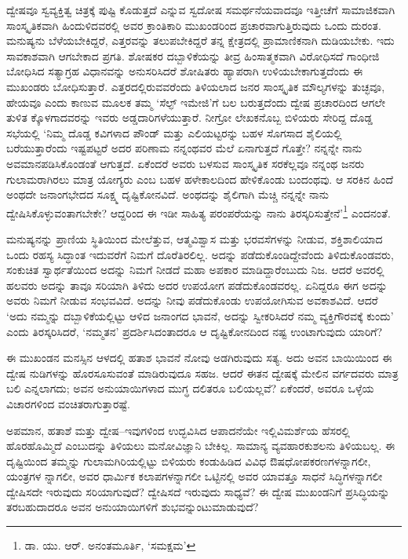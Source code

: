 ದ್ವೇಷವೂ ಸ್ವವ್ಯಕ್ತಿತ್ವ ಚಿತ್ರಕ್ಕೆ ಪುಷ್ಟಿ ಕೊಡುತ್ತದೆ ಎನ್ನುವ ಸ್ವದೋಷ ಸಮರ್ಥನೆಯವಾದವೂ ಇತ್ತೀಚೆಗೆ ಸಾಮಾಜಿಕವಾಗಿ ಸಾಂಸ್ಕೃತಿಕವಾಗಿ ಹಿಂದುಳಿದವರಲ್ಲಿ ಅವರ ಕ್ರಾಂತಿಕಾರಿ ಮುಖಂಡರಿಂದ ಪ್ರಚಾರವಾಗುತ್ತಿರುವುದು ಒಂದು ದುರಂತ. ಮನುಷ್ಯನು ಬೆಳೆಯಬೇಕಿದ್ದರೆ, ಎತ್ತರವನ್ನು ತಲುಪಬೇಕಿದ್ದರೆ ತನ್ನ ಕ್ಷೇತ್ರದಲ್ಲಿ ಪ್ರಾಮಾಣಿಕನಾಗಿ ದುಡಿಯಬೇಕು. ಇದು ಸಾವಕಾಶವಾಗಿ ಆಗಬೇಕಾದ ಪ್ರಗತಿ. ಶೋಷಕರ ದಬ್ಬಾಳಿಕೆಯನ್ನು ತೀವ್ರ ಹಿಂಸಾತ್ಮಕವಾಗಿ ವಿರೋಧಿಸದೆ ಗಾಂಧೀಜಿ ಬೋಧಿಸಿದ ಸತ್ಯಾಗ್ರಹ ವಿಧಾನವನ್ನು ಅನುಸರಿಸಿದರೆ ಶೋಷಿತರು ಹ್ಯಾಪರಾಗಿ ಉಳಿಯಬೇಕಾಗುತ್ತದೆಂದು ಈ ಮುಖಂಡರು ಬೋಧಿಸುತ್ತಾರೆ. ಎತ್ತರದಲ್ಲಿರುವವರೆಂದು ತಿಳಿಯ\-ಲಾದ ಜನರ ಸಾಂಸ್ಕೃತಿಕ ಮೌಲ್ಯಗಳನ್ನು ತುಚ್ಛವೂ, ಹೇಯವೂ ಎಂದು ಕಾಣುವ ಮೂಲಕ ತಮ್ಮ ‘ಸೆಲ್ಫ್ ಇಮೇಜಿ’ಗೆ ಬಲ ಬರುತ್ತದೆಂದು ದ್ವೇಷ ಪ್ರಚಾರದಿಂದ ಆಗಲೇ ತುಳಿತ ಕ್ಕೊಳಗಾದವರನ್ನು ಇವರು ಅಡ್ಡದಾರಿಗಳೆಯುತ್ತಾರೆ. ನೀಗ್ರೋ ಲೇಖಕನೊಬ್ಬ ಬಿಳಿಯರು ಸೇರಿದ್ದ ದೊಡ್ಡ ಸಭೆಯಲ್ಲಿ ‘ನಿಮ್ಮ ದೊಡ್ಡ ಕವಿಗಳಾದ ಪೌಂಡ್ ಮತ್ತು ಎಲಿಯಟ್ಟರನ್ನು ಬಹಳ ಸೊಗಸಾದ ಶೈಲಿಯಲ್ಲಿ ಬರೆಯುತ್ತಾರೆಂದು ಇಷ್ಟಪಟ್ಟರೆ ಅದರ ಪರಿಣಾಮ ನನ್ನಂಥವರ ಮೆಲೆ ಏನಾಗುತ್ತದೆ ಗೊತ್ತೇ? ನನ್ನನ್ನೇ ನಾನು ಅವಮಾನಪಡಿಸಿಕೊಂಡಂತೆ ಆಗುತ್ತದೆ. ಏಕೆಂದರೆ ಅವರು ಬಳಸುವ ಸಾಂಸ್ಕೃತಿಕ ಸರಕೆಲ್ಲವೂ ನನ್ನಂಥ ಜನರು ಗುಲಾಮರಾಗಿರಲು ಮಾತ್ರ ಯೋಗ್ಯರು ಎಂಬ ಬಹಳ ಹಳೇಕಾಲದಿಂದ ಹೇಳಿಕೊಂಡು ಬಂದಂಥವು. ಆ ಸರಕಿನ ಹಿಂದೆ ಅಂಥದೇ ಜನಾಂಗಭೇದದ ಸೂಕ್ಷ್ಮ ದೃಷ್ಟಿಕೋನವಿದೆ. ಅಂಥದನ್ನು ಶೈಲಿಗಾಗಿ ಮೆಚ್ಚಿ ನನ್ನನ್ನೇ ನಾನು ದ್ವೇಷಿಸಿಕೊಳ್ಳುವಂತಾಗಬೇಕೇ? ಆದ್ದರಿಂದ ಈ ಇಡೀ ಸಾಹಿತ್ಯ ಪರಂಪರೆಯನ್ನು ನಾನು ತಿರಸ್ಕರಿಸುತ್ತೇನೆ’\footnote{ ಡಾ. ಯು. ಆರ್. ಅನಂತಮೂರ್ತಿ, ‘ಸಮಕ್ಷಮ’} ಎಂದನಂತೆ.

ಮನುಷ್ಯನನ್ನು ಪ್ರಾಣಿಯ ಸ್ಥಿತಿಯಿಂದ ಮೇಲೆತ್ತುವ, ಆತ್ಮವಿಶ್ವಾಸ ಮತ್ತು ಭರವಸೆಗಳನ್ನು ನೀಡುವ, ಶಕ್ತಿಶಾಲಿಯಾದ ಒಂದು ರಹಸ್ಯ ಸಿದ್ಧಾಂತ ಇದುವರೆಗೆ ನಿಮಗೆ ದೊರೆತಿರಲಿಲ್ಲ. ಅದನ್ನು ಪಡೆದುಕೊಂಡಿದ್ದೇವೆಂದು ತಿಳಿದುಕೊಂಡವರು, ಸಂಕುಚಿತ ಸ್ವಾರ್ಥತೆಯಿಂದ ಅದನ್ನು ನಿಮಗೆ ನೀಡದೆ ಮಹಾ ಅಪಕಾರ ಮಾಡಿದ್ದಾರೆಂಬುದು ನಿಜ. ಆದರೆ ಅವರಲ್ಲಿ ಹಲವರು ಅದನ್ನು ತಾವೂ ಸರಿಯಾಗಿ ತಿಳಿದು ಅದರ ಉಪಯೋಗ ಪಡೆದುಕೊಂಡವರಲ್ಲ. ಏನಿದ್ದರೂ ಈಗ ಅದನ್ನು ಅವರು ನಿಮಗೆ ನೀಡುವ ಸಂಭವವಿದೆ. ಅದನ್ನು ನೀವು ಪಡೆದುಕೊಂಡು ಉಪಯೋಗಿಸುವ ಅವಕಾಶವಿದೆ. ಆದರೆ ‘ಅದು ನಮ್ಮನ್ನು ದಬ್ಬಾಳಿಕೆಯಲ್ಲಿಟ್ಟು ಆಳಿದ ಜನಾಂಗದ ಭಾವನೆ, ಅದನ್ನು ಸ್ವೀಕರಿಸಿದರೆ ನಮ್ಮ ವ್ಯಕ್ತಿಗೌರವಕ್ಕೆ ಕುಂದು’ ಎಂದು ತಿರಸ್ಕರಿಸಿದರೆ, ‘ನಮ್ಮತನ’ ಪ್ರದರ್ಶಿಸಿ\-ದಂತಾದರೂ ಆ ದೃಷ್ಟಿಕೋನದಿಂದ ನಷ್ಟ ಉಂಟಾಗುವುದು ಯಾರಿಗೆ?

ಈ ಮುಖಂಡನ ಮನಸ್ಸಿನ ಆಳದಲ್ಲಿ ಹತಾಶ ಭಾವನೆ ನೋವು ಅಡಗಿರುವುದು ಸತ್ಯ. ಅದು ಅವನ ಬಾಯಿಯಿಂದ ಈ ದ್ವೇಷ ನುಡಿಗಳನ್ನು ಹೊರಸೂಸುವಂತೆ ಮಾಡಿರುವುದೂ ಸಹಜ. ಆದರೆ ಈತನ ದ್ವೇಷಕ್ಕೆ ಮೇಲಿನ ವರ್ಗದವರು ಮಾತ್ರ ಬಲಿ ಎನ್ನಲಾಗದು; ಅವನ ಅನುಯಾಯಿಗಳಾದ ಮುಗ್ಧ ದಲಿತರೂ ಬಲಿಯಲ್ಲವೆ? ಏಕೆಂದರೆ, ಅವರೂ ಒಳ್ಳೆಯ ವಿಚಾರಗಳಿಂದ ವಂಚಿತರಾಗುತ್ತಾರಷ್ಟೆ.

ಅಪಮಾನ, ಹತಾಶೆ ಮತ್ತು ದ್ವೇಷ–ಇವುಗಳಿಂದ ಉದ್ಭವಿಸಿದ ಆಪಾದನೆಯೇ ಇಲ್ಲಿ\break ವಿಮರ್ಶೆಯ ಹೆಸರಲ್ಲಿ ಹೊರಹೊಮ್ಮಿದೆ ಎಂಬುದನ್ನು ತಿಳಿಯಲು ಮನೋವಿಜ್ಞಾನಿ ಬೇಕಿಲ್ಲ. ಸಾಮಾನ್ಯ ವ್ಯವಹಾರಕುಶಲನು ತಿಳಿಯಬಲ್ಲ. ಈ ದೃಷ್ಟಿಯಿಂದ ತಮ್ಮನ್ನು ಗುಲಾಮಗಿರಿಯಲ್ಲಿಟ್ಟು ಬಿಳಿಯರು ಕಂಡುಹಿಡಿದ ವಿವಿಧ ಔಷಧೋಪಕರಣಗಳನ್ನಾಗಲೀ, ಯಂತ್ರಗಳ ನ್ನಾಗಲೀ, ಅವರ ಧಾರ್ಮಿಕ ಕಲಾಪಗಳನ್ನಾಗಲೀ ಒಟ್ಟಿನಲ್ಲಿ ಅವರ ಯಾವತ್ತೂ ಸಾಧನೆ ಸಿದ್ಧಿಗಳನ್ನಾಗಲೀ ದ್ವೇಷಿಸದೇ ಇರುವುದು ಸರಿಯಾಗುವುದೆ? ದ್ವೇಷಿಸದೆ ಇರುವುದು ಸಾಧ್ಯವೆ? ಈ ದ್ವೇಷ ಮುಖಂಡನಿಗೆ ಪ್ರಸಿದ್ಧಿಯನ್ನು ತರಬಹುದಾದರೂ ಅವನ ಅನುಯಾಯಿಗಳಿಗೆ ಶುಭವನ್ನುಂಟುಮಾಡುವುದೆ?

